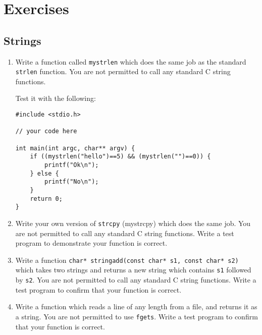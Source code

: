 
\chapter{Exercises}



\section*{Strings}

\begin{enumerate}
\item
Write a function called \texttt{mystrlen} which does the same job as the standard \texttt{strlen} function.
You are not permitted to call any standard C string functions.

Test it with the following:
\begin{lstlisting}[numbers=none]
#include <stdio.h>

// your code here

int main(int argc, char** argv) {
    if ((mystrlen("hello")==5) && (mystrlen("")==0)) {
        printf("Ok\n");
    } else {
        printf("No\n");
    }
    return 0;
}
\end{lstlisting}

\item Write your own version of \texttt{strcpy} (mystrcpy) which does the same job.
You are not permitted to call any standard C string functions.
Write a test program to demonstrate your function is correct.

\item Write a function \lstinline!char* stringadd(const char* s1, const char* s2)! which takes two strings and 
returns a new string which contains \texttt{s1} followed by \texttt{s2}.
You are not permitted to call any standard C string functions.
Write a test program to confirm that your function is correct.

\item Write a function which reads a line of any length from a file, and returns it as a string.
You are not permitted to use \texttt{fgets}.
Write a test program to confirm that your function is correct.
 
\end{enumerate}
